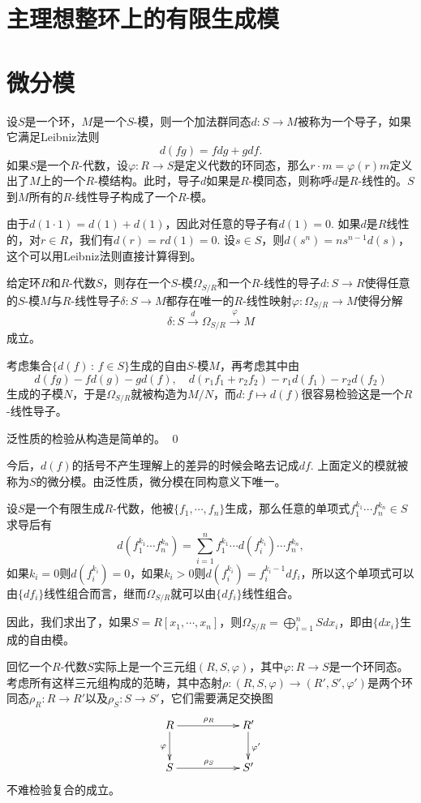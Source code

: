 \section{主理想整环上的有限生成模}

\section{微分模}

\para 设$S$是一个环，$M$是一个$S$-模，则一个加法群同态$d:S\to M$被称为一个导子，如果它满足Leibniz法则
\[
	d(fg)=fdg+gdf.
\]
如果$S$是一个$R$-代数，设$\varphi:R\to S$是定义代数的环同态，那么$r\cdot m=\varphi(r)m$定义出了$M$上的一个$R$-模结构。此时，导子$d$如果是$R$-模同态，则称呼$d$是$R$-线性的。$S$到$M$所有的$R$-线性导子构成了一个$R$-模。

由于$d(1\cdot 1)=d(1)+d(1)$，因此对任意的导子有$d(1)=0$. 如果$d$是$R$线性的，对$r\in R$，我们有$d(r)=rd(1)=0$. 设$s\in S$，则$d(s^n)=ns^{n-1}d(s)$，这个可以用Leibniz法则直接计算得到。

\pro 给定环$R$和$R$-代数$S$，则存在一个$S$-模$\Omega_{S/R}$和一个$R$-线性的导子$d:S\to R$使得任意的$S$-模$M$与$R$-线性导子$\delta: S\to M$都存在唯一的$R$-线性映射$\varphi:\Omega_{S/R}\to M$使得分解
\[
	\delta:S\xrightarrow{d}\Omega_{S/R}\xrightarrow{\varphi}M
\]
成立。

\proof
	考虑集合$\{d(f)\,:\, f\in S\}$生成的自由$S$-模$M$，再考虑其中由
	\[
	d(fg)-fd(g)-gd(f),\quad d(r_1f_1+r_2f_2)-r_1d(f_1)-r_2d(f_2)
	\]
	生成的子模$N$，于是$\Omega_{S/R}$就被构造为$M/N$，而$d:f\mapsto d(f)$很容易检验这是一个$R$-线性导子。

	泛性质的检验从构造是简单的。
\qed

今后，$d(f)$的括号不产生理解上的差异的时候会略去记成$df$. 上面定义的模就被称为$S$的微分模。由泛性质，微分模在同构意义下唯一。

\para 设$S$是一个有限生成$R$-代数，他被$\{f_1,\cdots,f_n\}$生成，那么任意的单项式$f_1^{k_1}\cdots f_n^{k_n}\in S$求导后有
\[
	d(f_1^{k_1}\cdots f_n^{k_n})=\sum_{i=1}^n f_1^{k_1}\cdots d(f_i^{k_i})\cdots f_n^{k_n},
\]
如果$k_i=0$则$d(f_i^{k_i})=0$，如果$k_i>0$则$d(f_i^{k_i})=f_i^{k_i-1}df_i$，所以这个单项式可以由$\{df_i\}$线性组合而言，继而$\Omega_{S/R}$就可以由$\{df_i\}$线性组合。

因此，我们求出了，如果$S=R[x_1,\cdots,x_n]$，则$\Omega_{S/R}=\bigoplus_{i=1}^n Sdx_i$，即由$\{dx_i\}$生成的自由模。

\para 回忆一个$R$-代数$S$实际上是一个三元组$(R,S,\varphi)$，其中$\varphi:R\to S$是一个环同态。考虑所有这样三元组构成的范畴，其中态射$\rho:(R,S,\varphi)\to (R',S',\varphi')$是两个环同态$\rho_R:R\to R'$以及$\rho_S:S\to S'$，它们需要满足交换图
\[
\begin{xy}
	\xymatrix
	{
		R\ar[rr]^{\rho_R} \ar[d]_{\varphi}&&R' \ar[d]^{\varphi'}\\
		S\ar[rr]^{\rho_S}&&S'
	}
\end{xy}
\]
不难检验复合的成立。

